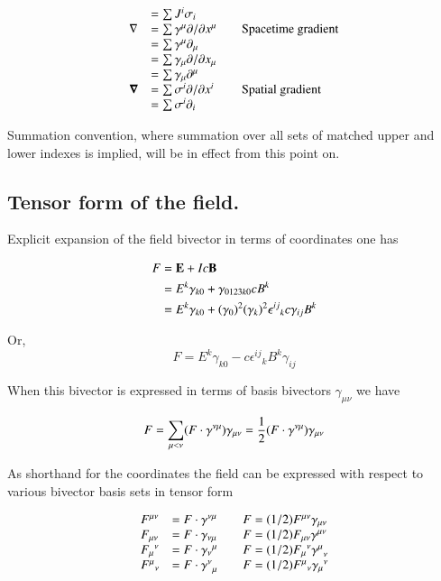 \documentclass{article}
\newcommand{\grad}[0]{\nabla}
\newcommand{\spacegrad}[0]{\boldsymbol{\nabla}}
\begin{document}
\begin{equation*}
\begin{array}{l l l}
    &= \sum J^i \sigma_i \\
\grad &= \sum \gamma^{\mu} \partial/\partial {x^{\mu}} & \quad \mbox{Spacetime gradient} \\
      &= \sum \gamma^{\mu}\partial_{\mu} \\
      &= \sum \gamma_{\mu} \partial/\partial {x_{\mu}} \\
      &= \sum \gamma_{\mu}\partial^{\mu} \\
\spacegrad &= \sum \sigma^{i} \partial/\partial{x^{i}} & \quad \mbox{Spatial gradient} \\
           &= \sum \sigma^{i}\partial_{i} \\
\end{array}
\end{equation*}

Summation convention, where summation over all sets of matched upper and lower indexes is implied, will be in effect from this point on.

\subsection{ Tensor form of the field. }

Explicit expansion of the field bivector in terms of coordinates one has

\begin{align*}
F
&= \mathbf{E} + I c \mathbf{B} \\
&= E^k \gamma_{k0} + \gamma_{0123k0} c B^k \\
&= E^k \gamma_{k0} + {(\gamma_{0})}^2 {(\gamma_{k})}^2 {\epsilon^{ij}}_k c \gamma_{ij} B^k \\
\end{align*}

Or,
\begin{equation}
F = E^k \gamma_{k0} - c {\epsilon^{ij}}_k B^k \gamma_{ij}
\end{equation}

When this bivector is expressed in terms of basis bivectors $\gamma_{\mu\nu}$ we have

\begin{align*}
F
= \sum_{\mu<\nu} (F \cdot \gamma^{\nu\mu}) \gamma_{\mu\nu}
= \frac{1}{2} (F \cdot \gamma^{\nu\mu}) \gamma_{\mu\nu}
\end{align*}

As shorthand for the coordinates the field can be expressed with respect to various bivector basis sets in tensor form

\begin{equation*}
\begin{array}{l l l}
F^{\mu\nu} &= F \cdot \gamma^{\nu\mu} & \quad F = (1/2) F^{\mu\nu} \gamma_{\mu\nu} \\
F_{\mu\nu} &= F \cdot \gamma_{\nu\mu} & \quad F = (1/2) F_{\mu\nu} \gamma^{\mu\nu} \\
{F_{\mu}}^\nu &= F \cdot {\gamma_{\nu}}^{\mu} & \quad F = (1/2) {F_{\mu}}^{\nu} {\gamma^{\mu}}_{\nu} \\
{F^{\mu}}_\nu &= F \cdot {\gamma^{\nu}}_{\mu} & \quad F = (1/2) {F^{\mu}}_{\nu} {\gamma_{\mu}}^{\nu}
\end{array}
\end{equation*}
\end{document}
